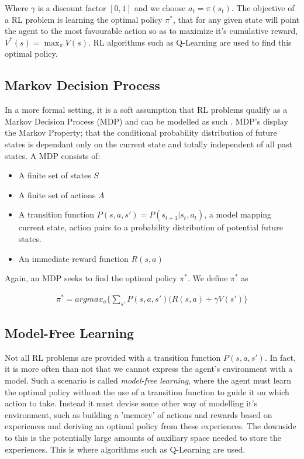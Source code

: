 Where $\gamma$ is a discount factor $[0, 1]$ and we choose $a_t = \pi(s_t)$. The objective of a RL
problem is learning the optimal policy $\pi^*$, that for any given state will point the agent to the
most favourable action so as to maximize it's cumulative reward, $V^*(s) = \max_{\pi}V(s)$. RL
algorithms such as Q-Learning are used to find this optimal policy. \paragraph{}

\subsection{Markov Decision Process}
In a more formal setting, it is a soft assumption that RL problems qualify as a Markov Decision
Process (MDP) and can be modelled as such \cite{survey-drl}. MDP's display the Markov Property; that
the conditional probability distribution of future states is dependant only on the current state and
totally independent of all past states. A MDP consists of:

\begin{itemize}
    \item A finite set of states $S$
    \item A finite set of actions $A$
    \item A transition function $P(s, a, s') = P(s_{t+1}|s_t, a_t)$, a model mapping current state,
          action pairs to a probability distribution of potential future states.
    \item An immediate reward function $R(s, a)$
\end{itemize}

Again, an MDP seeks to find the optimal policy $\pi^*$. We define $\pi^*$ as

\begin{align*}
    \pi^* = argmax_a\{\sum_{s'}P(s, a, s')(R(s, a) + \gamma V(s')\}
\end{align*}

\subsection{Model-Free Learning}
Not all RL problems are provided with a transition function $P(s, a, s')$. In fact, it is more often
than not that we cannot express the agent's environment with a model. Such a scenario is called
\textit{model-free learning}, where the agent must learn the optimal policy without the use of a
transition function to guide it on which action to take. Instead it must devise some other way of
modelling it's environment, such as building a 'memory' of actions and rewards based on experiences
and deriving an optimal policy from these experiences. The downside to this is the potentially large
amounts of auxiliary space needed to store the experiences. This is where algorithms such as
Q-Learning are used. \paragraph{}

